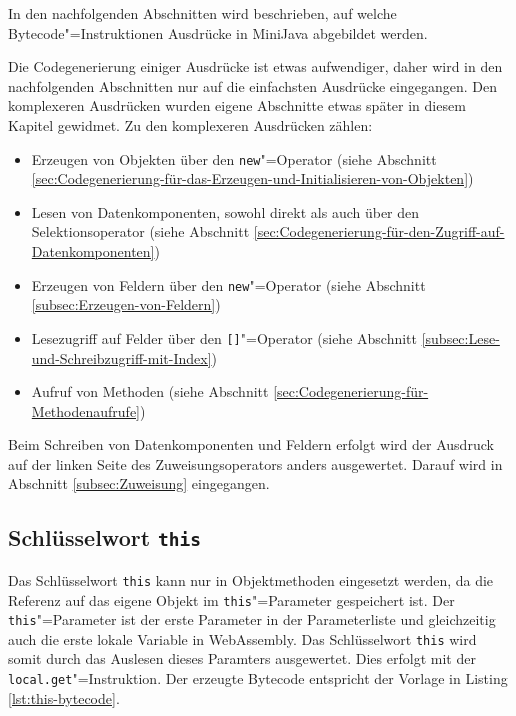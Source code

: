 In den nachfolgenden Abschnitten wird beschrieben, auf welche Bytecode"=Instruktionen Ausdrücke in MiniJava abgebildet werden.

Die Codegenerierung einiger Ausdrücke ist etwas aufwendiger, daher wird in den nachfolgenden Abschnitten nur auf die einfachsten Ausdrücke eingegangen. Den komplexeren Ausdrücken wurden eigene Abschnitte etwas später in diesem Kapitel gewidmet. Zu den komplexeren Ausdrücken zählen: 
\begin{itemize}
    \item Erzeugen von Objekten über den \lstinline{new}"=Operator (siehe Abschnitt \ref{sec:Codegenerierung-für-das-Erzeugen-und-Initialisieren-von-Objekten})
    \item Lesen von Datenkomponenten, sowohl direkt als auch über den Selektionsoperator (siehe Abschnitt \ref{sec:Codegenerierung-für-den-Zugriff-auf-Datenkomponenten})
    \item Erzeugen von Feldern über den \lstinline{new}"=Operator (siehe Abschnitt \ref{subsec:Erzeugen-von-Feldern})
    \item Lesezugriff auf Felder über den \lstinline{[]}"=Operator (siehe Abschnitt \ref{subsec:Lese-und-Schreibzugriff-mit-Index})
    \item Aufruf von Methoden (siehe Abschnitt \ref{sec:Codegenerierung-für-Methodenaufrufe})
\end{itemize}

Beim Schreiben von Datenkomponenten und Feldern erfolgt wird der Ausdruck auf der linken Seite des Zuweisungsoperators anders ausgewertet. Darauf wird in Abschnitt \ref{subsec:Zuweisung} eingegangen.

\pagebreak
\subsection{Schlüsselwort \lstinline{this}}

Das Schlüsselwort \lstinline{this} kann nur in Objektmethoden eingesetzt werden, da die Referenz auf das eigene Objekt im \lstinline{this}"=Parameter gespeichert ist. Der \lstinline{this}"=Parameter ist der erste Parameter in der Parameterliste und gleichzeitig auch die erste lokale Variable in WebAssembly. Das Schlüsselwort \lstinline{this} wird somit durch das Auslesen dieses Paramters ausgewertet. Dies erfolgt mit der \lstinline{local.get}"=Instruktion. Der erzeugte Bytecode entspricht der Vorlage in Listing \ref{lst:this-bytecode}.



